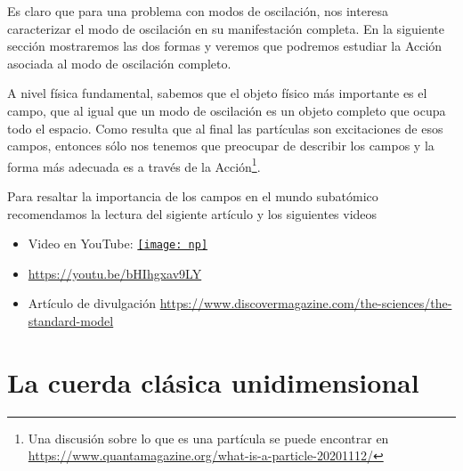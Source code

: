 Es claro que para una problema con modos de oscilación, nos interesa caracterizar el modo de oscilación en su manifestación completa. En la siguiente sección mostraremos las dos formas y veremos que  podremos  estudiar la Acción asociada al modo de oscilación completo.

A nivel física fundamental, sabemos que el objeto físico más importante es el campo, que al igual que un modo de oscilación es un objeto completo que ocupa todo el espacio.
Como resulta que al final las partículas son excitaciones de esos campos, entonces sólo nos tenemos que preocupar de describir los campos y la forma más adecuada es
a través de la Acción\footnote{Una discusión sobre lo que es una partícula se puede encontrar en \url{https://www.quantamagazine.org/what-is-a-particle-20201112/}}.

Para resaltar la importancia de los campos en el mundo subatómico recomendamos la lectura del sigiente artículo y los siguientes videos
\begin{itemize}
\item Video en YouTube: \href{kk.org}{\texttt{[image: np]}}
\item \url{https://youtu.be/bHIhgxav9LY}
\item Artículo de divulgación \url{https://www.discovermagazine.com/the-sciences/the-standard-model}
\end{itemize}



\section{La cuerda clásica unidimensional}
\label{sec:la-cuerda-clasica}

